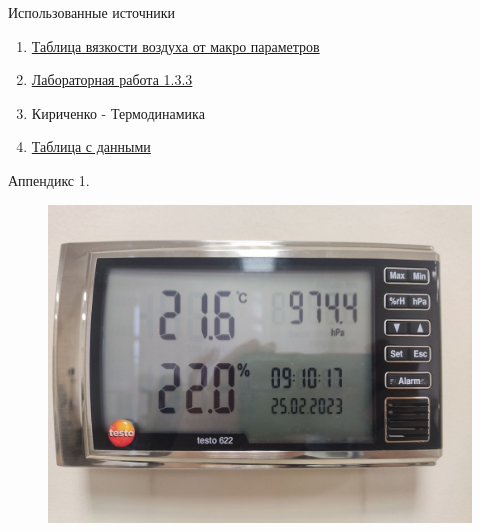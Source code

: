 \begin{frame}{Использованные источники}
    \begin{enumerate}
        \item \href{https://www.dokipedia.ru/document/5319908?pid=150}{Таблица вязкости воздуха от макро параметров}
        \item \href{https://mipt.ru/education/chair/physics/S_II/lab/133.pdf}{Лабораторная работа 1.3.3}
        \item Кириченко - Термодинамика
        \item \href{https://docs.google.com/spreadsheets/d/16-xvHyhHE6TZBMZQnDGtpvOyMQLfq6wyw0M_AGe8FYA/edit?usp=sharing}{Таблица с данными}
    \end{enumerate}
\end{frame}

\begin{frame}{Аппендикс 1.}
\begin{minipage}{.5\textwidth}
\begin{figure}
    \includegraphics[scale=0.15]{Images_viscosty/photo_2023-03-11_09-20-17.jpg}
\end{figure}
\end{minipage}%
\begin{minipage}{.5\textwidth}
\begin{figure}

\end{figure}
\end{minipage}
\end{frame}
